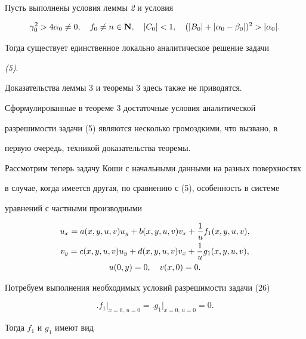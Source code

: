 \begin{thm}


Пусть выполнены условия леммы {\em 2} и условия


$$


\gamma^2_0>4\alpha_0\ne 0,\quad f_0\ne n\in\bold N,\quad


|C_0|<1,\quad (|B_0|+|\alpha_0-\beta_0|)^2>|\alpha_0|.


$$


Тогда существует единственное локально аналитическое решение задачи


{\em (5)}.


\end{thm}





Доказательства леммы 3 и теоремы 3 здесь также не приводятся.





Сформулированные в теореме 3 достаточные условия аналитической


разрешимости задачи (5) являются несколько громоздкими, что вызвано, в


первую очередь, техникой доказательства теоремы.





Рассмотрим теперь задачу Коши с начальными данными на разных поверхностях


в случае, когда имеется другая, по сравнению с (5), особенность в системе


уравнений с частными производными


\begin{gather}


u_x=a(x,y,u,v)u_y+b(x,y,u,v)v_x+\frac{1}{u}f_1(x,y,u,v),\notag\\


v_y=c(x,y,u,v)u_y+d(x,y,u,v)v_x+\frac{1}{u}g_1(x,y,u,v),\\


u(0,y)=0,\quad v(x,0)=0.\notag


\end{gather}


Потребуем выполнения необходимых условий разрешимости задачи (26)


$$


\bigl. f_1\bigr|_{x=0,\,u=0}=\bigl.g_1\bigr|_{x=0,\,u=0}=0.


$$


Тогда $f_1$ и $g_1$ имеют вид


